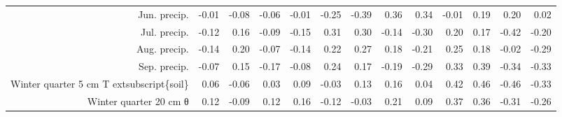 \begin{table}[ht]
\begin{tabular}{rrrrrrrrrrrrr}
  Jun. precip. & -0.01 & -0.08 & -0.06 & -0.01 & -0.25 & -0.39 & 0.36 & 0.34 & -0.01 & 0.19 & 0.20 & 0.02 \\ 
  Jul. precip. & -0.12 & 0.16 & -0.09 & -0.15 & 0.31 & 0.30 & -0.14 & -0.30 & 0.20 & 0.17 & -0.42 & -0.20 \\ 
  Aug. precip. & -0.14 & 0.20 & -0.07 & -0.14 & 0.22 & 0.27 & 0.18 & -0.21 & 0.25 & 0.18 & -0.02 & -0.29 \\ 
  Sep. precip. & -0.07 & 0.15 & -0.17 & -0.08 & 0.24 & 0.17 & -0.19 & -0.29 & 0.33 & 0.39 & -0.34 & -0.33 \\ 
  Winter quarter 5 cm T	extsubscript\{soil\} & 0.06 & -0.06 & 0.03 & 0.09 & -0.03 & 0.13 & 0.16 & 0.04 & 0.42 & 0.46 & -0.46 & -0.33 \\ 
  Winter quarter 20 cm θ & 0.12 & -0.09 & 0.12 & 0.16 & -0.12 & -0.03 & 0.21 & 0.09 & 0.37 & 0.36 & -0.31 & -0.26 \\ 
   \hline
\end{tabular}
\end{table}
